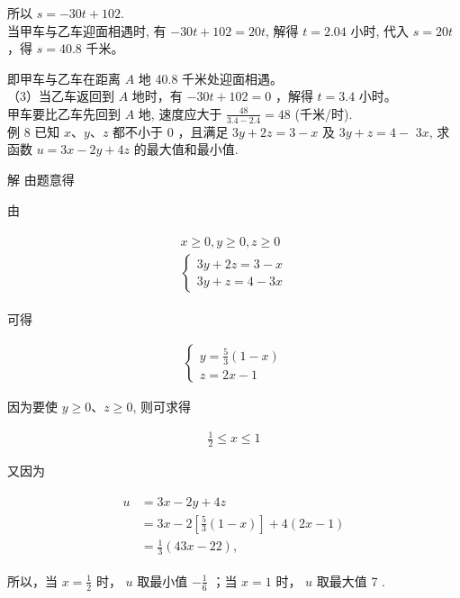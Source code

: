 \documentclass[10pt]{article}
\begin{document}
所以 $s=-30 t+102$.\\
当甲车与乙车迎面相遇时, 有 $-30 t+102=20 t$, 解得 $t=2.04$ 小时, 代入 $s=20 t$ ，得 $s=40.8$ 千米。

即甲车与乙车在距离 $A$ 地 40.8 千米处迎面相遇。\\
（3）当乙车返回到 $A$ 地时，有 $-30 t+102=0$ ，解得 $t=3.4$ 小时。\\
甲车要比乙车先回到 $A$ 地, 速度应大于 $\frac{48}{3.4-2.4}=48$ (千米/时).\\
例 8 已知 $x 、 y 、 z$ 都不小于 0 ，且满足 $3 y+2 z=3-x$ 及 $3 y+z=4-$ $3 x$, 求函数 $u=3 x-2 y+4 z$ 的最大值和最小值.

解 由题意得

由

\begin{align*}
\begin{gathered}
x \geqslant 0, y \geqslant 0, z \geqslant 0 \\
\left\{\begin{array}{l}
3 y+2 z=3-x \\
3 y+z=4-3 x
\end{array}\right.
\end{gathered}
\end{align*}

可得

\begin{align*}
\left\{\begin{array}{l}
y=\frac{5}{3}(1-x) \\
z=2 x-1
\end{array}\right.
\end{align*}

因为要使 $y \geqslant 0 、 z \geqslant 0$, 则可求得

\begin{align*}
\frac{1}{2} \leqslant x \leqslant 1
\end{align*}

又因为

\begin{align*}
\begin{aligned}
u & =3 x-2 y+4 z \\
& =3 x-2\left[\frac{5}{3}(1-x)\right]+4(2 x-1) \\
& =\frac{1}{3}(43 x-22),
\end{aligned}
\end{align*}

所以，当 $x=\frac{1}{2}$ 时， $u$ 取最小值 $-\frac{1}{6}$ ；当 $x=1$ 时， $u$ 取最大值 7 .
\end{document}
